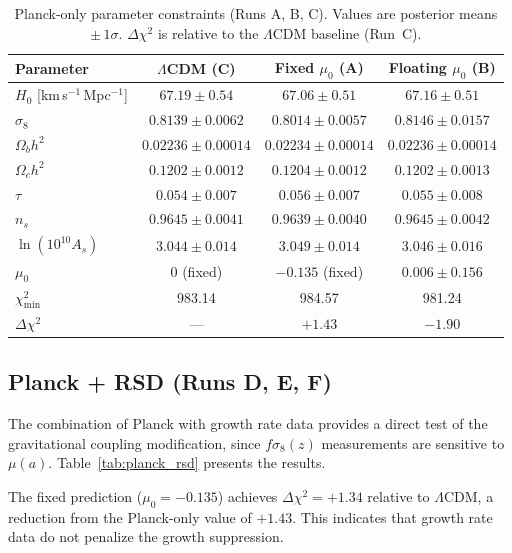 \documentclass[11pt]{article}
\begin{document}
\begin{table}[H]
\centering
\caption{Planck-only parameter constraints (Runs A, B, C). Values are posterior means $\pm\,1\sigma$. $\Delta\chi^2$ is relative to the $\Lambda$CDM baseline (Run~C).}
\label{tab:planck_only}
\begin{tabular}{lccc}
\toprule
Parameter & $\Lambda$CDM (C) & Fixed $\mu_0$ (A) & Floating $\mu_0$ (B) \\
\midrule
$H_0$ [km\,s$^{-1}$\,Mpc$^{-1}$] & $67.19 \pm 0.54$ & $67.06 \pm 0.51$ & $67.16 \pm 0.51$ \\
$\sigma_8$                          & $0.8139 \pm 0.0062$ & $0.8014 \pm 0.0057$ & $0.8146 \pm 0.0157$ \\
$\Omega_b h^2$                      & $0.02236 \pm 0.00014$ & $0.02234 \pm 0.00014$ & $0.02236 \pm 0.00014$ \\
$\Omega_c h^2$                      & $0.1202 \pm 0.0012$ & $0.1204 \pm 0.0012$ & $0.1202 \pm 0.0013$ \\
$\tau$                              & $0.054 \pm 0.007$ & $0.056 \pm 0.007$ & $0.055 \pm 0.008$ \\
$n_s$                               & $0.9645 \pm 0.0041$ & $0.9639 \pm 0.0040$ & $0.9645 \pm 0.0042$ \\
$\ln(10^{10}A_s)$                   & $3.044 \pm 0.014$ & $3.049 \pm 0.014$ & $3.046 \pm 0.016$ \\
$\mu_0$                             & $0$ (fixed)         & $-0.135$ (fixed)    & $0.006 \pm 0.156$ \\
\midrule
$\chi^2_\mathrm{min}$               & 983.14             & 984.57              & 981.24 \\
$\Delta\chi^2$                      & ---                & $+1.43$             & $-1.90$ \\
\bottomrule
\end{tabular}
\end{table}


\subsection{Planck + RSD (Runs D, E, F)}
\label{sec:planck_rsd}

The combination of Planck with growth rate data provides a direct test of the gravitational coupling modification, since $f\sigma_8(z)$ measurements are sensitive to $\mu(a)$.
Table~\ref{tab:planck_rsd} presents the results.

The fixed prediction ($\mu_0 = -0.135$) achieves $\Delta\chi^2 = +1.34$ relative to $\Lambda$CDM, a reduction from the Planck-only value of $+1.43$.
This indicates that growth rate data do not penalize the growth suppression.
\end{document}
